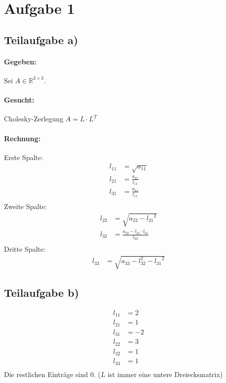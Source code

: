 \section*{Aufgabe 1}
\subsection*{Teilaufgabe a)}
\paragraph{Gegeben:} Sei $A \in \mathbb{R}^{3 \times 3}$.
\paragraph{Gesucht:} Cholesky-Zerlegung $A = L \cdot L^T$
\paragraph{Rechnung:}

Erste Spalte:
\begin{align}
	l_{11} &= \sqrt{a_{11}} \\
	l_{21} &= \frac{a_{21}}{l_{11}}\\
	l_{31} &= \frac{a_{31}}{l_{11}}\\
\end{align}
Zweite Spalte:
\begin{align}
	l_{22} &= \sqrt{a_{22} - {l_{21}}^2}\\
	l_{32} &= \frac{a_{32} -l_{21} \cdot l_{31}}{l_{22}} \\
\end{align}
Dritte Spalte:
\begin{align}
	l_{33} &= \sqrt{a_{33}-{l_{32}^2}-{l_{31}}^2}
\end{align}

\subsection*{Teilaufgabe b)}
\begin{align}
	l_{11} &= 2 \\
	l_{21} &= 1 \\
	l_{31} &= -2 \\
	l_{22} &= 3 \\
	l_{32} &= 1 \\
	l_{33} &= 1 \\
\end{align}
Die restlichen Einträge sind $0$. ($L$ ist immer eine untere Dreiecksmatrix)

